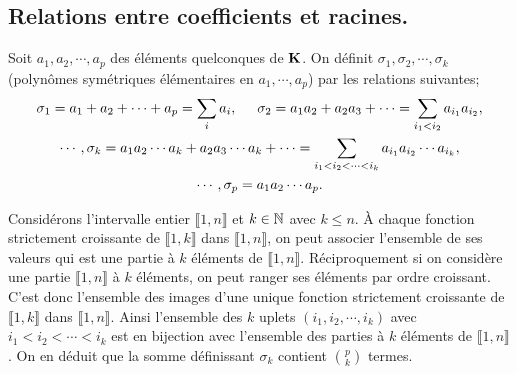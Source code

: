 \subsection{Relations entre coefficients et racines.}
\begin{defi}
 Soit $a_1,a_2,\cdots,a_p$ des éléments quelconques de $\mathbf{K}$. On définit $\sigma_1, \sigma_2, \cdots ,\sigma_k$ (polynômes symétriques élémentaires en $a_1, \cdots, a_p$) par les relations suivantes;
\begin{multline*}
 \sigma_1 = a_1 + a_2 + \cdots + a_p  = \sum_{i}a_i, \hspace{0.5cm}
\sigma_2 = a_1 a_2 + a_2a_3 + \cdots   = \sum_{i_1<i_2}a_{i_1}a_{i_2}, \\
 \cdots, 
\sigma_k = a_1a_2 \cdots a_k + a_2a_3\cdots a_k + \cdots   = \sum_{i_1<i_2<\cdots <i_k}a_{i_1}a_{i_2}\cdots a_{i_k}, \\
 \cdots, \sigma_p = a_1a_2\cdots a_p.
\end{multline*}
\end{defi}
\begin{rem}
 Considérons l'intervalle entier $\llbracket 1, n\rrbracket$ et $k\in \mathbb{N}$ avec $k\leq n$. \`A chaque fonction strictement croissante de $\llbracket 1,k \rrbracket$ dans $\llbracket 1,n \rrbracket$, on peut associer l'ensemble de ses valeurs qui est une partie à $k$ éléments de $\llbracket 1,n \rrbracket$. Réciproquement si on considère une partie $\llbracket 1,n \rrbracket$ à $k$ éléments, on peut ranger ses éléments par ordre croissant. C'est donc l'ensemble des images d'une unique fonction strictement croissante de $\llbracket 1,k \rrbracket$ dans $\llbracket 1,n \rrbracket$. Ainsi l'ensemble des $k$ uplets $(i_1,i_2,\cdots,i_k)$ avec $i_1< i_2 < \cdots < i_k$ est en bijection avec l'ensemble des parties à $k$ éléments de $\llbracket 1,n \rrbracket$. On en déduit que la somme définissant $\sigma_k$ contient $\binom{p}{k}$ termes.
\end{rem}

